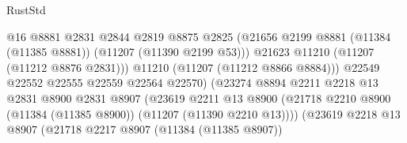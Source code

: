 \begin{lexlean}{RustStd}
\begin{coremodule}
                                              @16
                                              @8881
                                              @2831
                                              @2844
                                              @2819
                                              @8875
                                              @2825
                                              (@21656
                                                @2199
                                                @8881
                                                (@11384 (@11385 @8881))
                                                (@11207 (@11390 @2199 @53)))
                                              @21623
                                              @11210
                                              (@11207 (@11212 @8876 @2831)))
                                            @11210
                                            (@11207 (@11212 @8866 @8884)))
                                          @22549
                                          @22552
                                          @22555
                                          @22559
                                          @22564
                                          @22570)
                                        (@23274
                                          @8894
                                          @2211
                                          @2218
                                          @13
                                          @2831
                                          @8900
                                          @2831
                                          @8907
                                          (@23619
                                            @2211
                                            @13
                                            @8900
                                            (@21718
                                              @2210
                                              @8900
                                              (@11384 (@11385 @8900))
                                              (@11207 (@11390 @2210 @13))))
                                          (@23619
                                            @2218
                                            @13
                                            @8907
                                            (@21718
                                              @2217
                                              @8907
                                              (@11384 (@11385 @8907))

\end{coremodule}
\end{lexlean}

